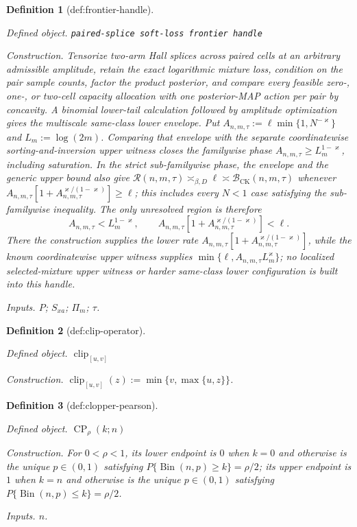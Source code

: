 \documentclass{article}
\newtheorem{definition}{Definition}
\begin{document}
\begin{definition}[def:frontier-handle]\label{def:frontier-handle}
\par\smallskip\noindent\emph{Defined object.} \texttt{paired-\allowbreak{}splice soft-\allowbreak{}loss frontier handle}
\par\smallskip\noindent\emph{Construction.} Tensorize two-arm Hall splices across paired cells at an arbitrary admissible amplitude, retain the exact logarithmic mixture loss, condition on the pair sample counts, factor the product posterior, and compare every feasible zero-, one-, or two-cell capacity allocation with one posterior-MAP action per pair by concavity. A binomial lower-tail calculation followed by amplitude optimization gives the multiscale same-class lower envelope. Put \(A_{n,m,\tau}:=\ell\min\{1,N^{-\varkappa}\}\) and \(L_m:=\log(2m)\). Comparing that envelope with the separate coordinatewise sorting-and-inversion upper witness closes the familywise phase \(A_{n,m,\tau}\ge L_m^{1-\varkappa}\), including saturation. In the strict sub-familywise phase, the envelope and the generic upper bound also give \(\mathcal R(n,m,\tau)\asymp_{\beta,D}\ell\asymp\mathcal B_{\mathrm{CK}}(n,m,\tau)\) whenever \(A_{n,m,\tau}[1+A_{n,m,\tau}^{\varkappa/(1-\varkappa)}]\ge\ell\); this includes every \(N<1\) case satisfying the sub-familywise inequality. The only unresolved region is therefore
\[
A_{n,m,\tau}<L_m^{1-\varkappa},
\qquad
A_{n,m,\tau}\left[1+A_{n,m,\tau}^{\varkappa/(1-\varkappa)}\right]<\ell.
\]
There the construction supplies the lower rate \(A_{n,m,\tau}[1+A_{n,m,\tau}^{\varkappa/(1-\varkappa)}]\), while the known coordinatewise upper witness supplies \(\min\{\ell,A_{n,m,\tau}L_m^{\varkappa}\}\); no localized selected-mixture upper witness or harder same-class lower configuration is built into this handle.
\par\smallskip\noindent\emph{Inputs.} \(P\); \(S_{xa}\); \(\Pi_m\); \(\tau\).
\end{definition}

\begin{definition}[def:clip-operator]\label{def:clip-operator}
\par\smallskip\noindent\emph{Defined object.} \(\operatorname{clip}_{[u,v]}\)
\par\smallskip\noindent\emph{Construction.} \(\operatorname{clip}_{[u,v]}(z):=\min\{v,\max\{u,z\}\}\).
\end{definition}

\begin{definition}[def:clopper-pearson]\label{def:clopper-pearson}
\par\smallskip\noindent\emph{Defined object.} \(\operatorname{CP}_{\rho}(k;n)\)
\par\smallskip\noindent\emph{Construction.} For \(0<\rho<1\), its lower endpoint is \(0\) when \(k=0\) and otherwise is the unique \(p\in(0,1)\) satisfying \(P\{\operatorname{Bin}(n,p)\ge k\}=\rho/2\); its upper endpoint is \(1\) when \(k=n\) and otherwise is the unique \(p\in(0,1)\) satisfying \(P\{\operatorname{Bin}(n,p)\le k\}=\rho/2\).
\par\smallskip\noindent\emph{Inputs.} \(n\).
\end{definition}
\end{document}
